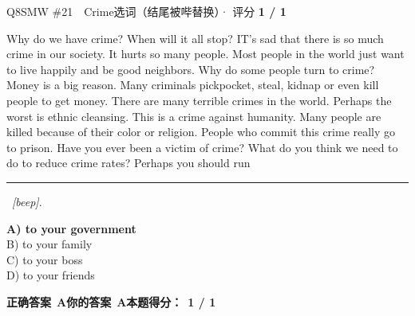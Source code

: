 \begin{qblock}{Q8\quad SMW \#21\ \ Crime}{选词（结尾被哔替换）· 评分 \textcolor{cAccent}{\bfseries 1 / 1}}
\begin{promptbox}
Why do we have crime? When will it all stop? IT's sad that there is so much crime in our society. It hurts so many people. Most people in the world just want to live happily and be good neighbors. Why do some people turn to crime? Money is a big reason. Many criminals pickpocket, steal, kidnap or even kill people to get money. There are many terrible crimes in the world. Perhaps the worst is ethnic cleansing. This is a crime against humanity. Many people are killed because of their color or religion. People who commit this crime really go to prison. Have you ever been a victim of crime? What do you think we need to do to reduce crime rates? Perhaps you should run \rule[0.3ex]{1.2cm}{0.4pt}\ \textit{[beep]}.
\end{promptbox}
{\small
{\color{cFix}\textbf{A) to your government}}\\
B) to your family\\
C) to your boss\\
D) to your friends}
\par\smallskip
\textbf{正确答案}\ \textcolor{cFix}{\bfseries A}\qquad\textbf{你的答案}\ \textcolor{cFix}{\bfseries A}\qquad\textbf{本题得分：}\ {\color{cAccent}\bfseries 1 / 1}
\end{qblock}

